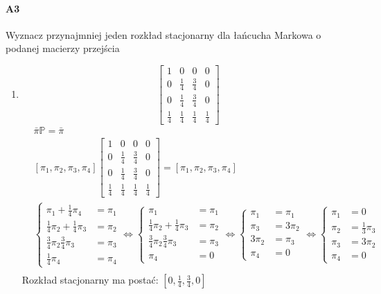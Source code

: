 \documentclass[a4paper,12pt]{article}
\theoremstyle{definition}%
\theoremstyle{definition}
\theoremstyle{problem}
\begin{document}
\paragraph{A3} Wyznacz przynajmniej jeden rozkład stacjonarny dla łańcucha Markowa o podanej macierzy przejścia
\begin{enumerate}[label=\alph*)]
\item 
$$\begin{bmatrix}
1&0&0&0\\
0&\frac{1}{4}&\frac{3}{4}&0\\
0&\frac{1}{4}&\frac{3}{4}&0\\
\frac{1}{4}&\frac{1}{4}&\frac{1}{4}&\frac{1}{4}
\end{bmatrix}$$
\begin{align*}
&\bar{\pi}\mathbb{P}=\bar{\pi}\\
&\left[\pi _1, \pi _2,\pi _3,\pi _4\right]\begin{bmatrix}
1&0&0&0\\
0&\frac{1}{4}&\frac{3}{4}&0\\
0&\frac{1}{4}&\frac{3}{4}&0\\
\frac{1}{4}&\frac{1}{4}&\frac{1}{4}&\frac{1}{4}
\end{bmatrix}=\left[\pi _1, \pi _2,\pi _3,\pi _4\right]\\
&\left\{\begin{matrix}
\pi _1+\frac{1}{4}\pi _4 & = \pi _1\\
\frac{1}{4}\pi _2+\frac{1}{4}\pi _3 &= \pi _2\\
\frac{3}{4}\pi _2\frac{3}{4}\pi _3 &= \pi _3\\
\frac{1}{4}\pi _4 &= \pi _4
\end{matrix}\right.\Leftrightarrow \left\{\begin{matrix}
\pi _1 & = \pi _1\\
\frac{1}{4}\pi _2+\frac{1}{4}\pi _3 &= \pi _2\\
\frac{3}{4}\pi _2\frac{3}{4}\pi _3 &= \pi _3\\
\pi _4 &= 0
\end{matrix}\right.\Leftrightarrow \left\{\begin{matrix}
\pi _1 & = \pi _1\\
\pi _3 &= 3\pi _2\\
3\pi _2 &= \pi _3\\
\pi _4 &= 0
\end{matrix}\right.\Leftrightarrow \left\{\begin{matrix}
\pi _1 & = 0\\
\pi _2 &= \frac{1}{3}\pi _3\\
\pi _3 &= 3\pi _2\\
\pi _4 &= 0
\end{matrix}\right.\\
\end{align*}
Rozkład stacjonarny ma postać: $\left[0, \frac{1}{4}, \frac{3}{4}, 0\right]$


\end{enumerate}
\end{document}
